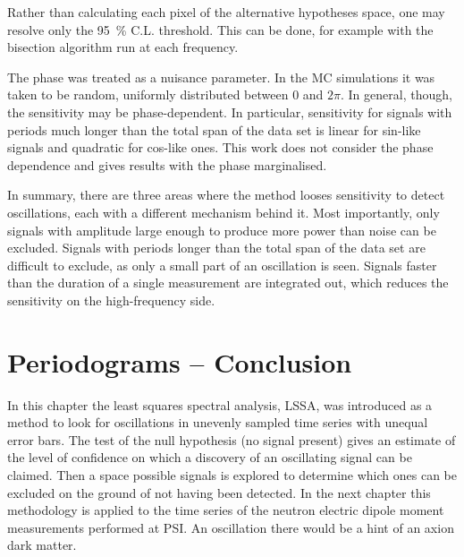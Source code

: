 Rather than calculating each pixel of the alternative hypotheses space, one may resolve only the \SI{95}{\percent} C.L. threshold. This can be done, for example with the bisection algorithm run at each frequency.

The phase was treated as a nuisance parameter. In the MC simulations it was taken to be random, uniformly distributed between $0$ and $2\pi$. In general, though, the sensitivity may be phase-dependent. In particular, sensitivity for signals with periods much longer than the total span of the data set is linear for sin-like signals and quadratic for cos-like ones. This work does not consider the phase dependence and gives results with the phase marginalised.

In summary, there are three areas where the method looses sensitivity to detect oscillations, each with a different mechanism behind it. Most importantly, only signals with amplitude large enough to produce more power than noise can be excluded. Signals with periods longer than the total span of the data set are difficult to exclude, as only a small part of an oscillation is seen. Signals faster than the duration of a single measurement are integrated out, which reduces the sensitivity on the high-frequency side.




\section*{Periodograms -- Conclusion}
In this chapter the least squares spectral analysis, LSSA, was introduced as a method to look for oscillations in unevenly sampled time series with unequal error bars. The test of the null hypothesis (no signal present) gives an estimate of the level of confidence on which a discovery of an oscillating signal can be claimed. Then a space possible signals is explored to determine which ones can be excluded on the ground of not having been detected. In the next chapter this methodology is applied to the time series of the neutron electric dipole moment measurements performed at PSI\@. An oscillation there would be a hint of an axion dark matter.
